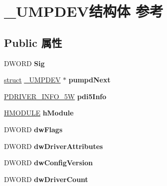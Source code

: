 \hypertarget{struct___u_m_p_d_e_v}{}\section{\+\_\+\+U\+M\+P\+D\+E\+V结构体 参考}
\label{struct___u_m_p_d_e_v}
\subsection*{Public 属性}
\begin{DoxyCompactItemize}
\item 
\mbox{\label{struct___u_m_p_d_e_v_af10f14fe142af9a3df4993b24d7759a9}} 
D\+W\+O\+RD {\bfseries Sig}
\item 
\mbox{\label{struct___u_m_p_d_e_v_aa696bf947431e40e24f0b5d2e3354632}} 
\hyperlink{interfacestruct}{struct} \hyperlink{struct___u_m_p_d_e_v}{\+\_\+\+U\+M\+P\+D\+EV} $\ast$ {\bfseries pumpd\+Next}
\item 
\mbox{\label{struct___u_m_p_d_e_v_abf9ac23be9ce5d1789b994edbbf67f2d}} 
\hyperlink{struct___d_r_i_v_e_r___i_n_f_o__5_w}{P\+D\+R\+I\+V\+E\+R\+\_\+\+I\+N\+F\+O\+\_\+5W} {\bfseries pdi5\+Info}
\item 
\mbox{\label{struct___u_m_p_d_e_v_ad2b15d04c534f15ec64376a24307349b}} 
\hyperlink{interfacevoid}{H\+M\+O\+D\+U\+LE} {\bfseries h\+Module}
\item 
\mbox{\label{struct___u_m_p_d_e_v_ac6164adaa7d00187807ac393afaf067e}} 
D\+W\+O\+RD {\bfseries dw\+Flags}
\item 
\mbox{\label{struct___u_m_p_d_e_v_a0088a142623885435d48e9e3ee0b51ef}} 
D\+W\+O\+RD {\bfseries dw\+Driver\+Attributes}
\item 
\mbox{\label{struct___u_m_p_d_e_v_a72ecede9b564d28a15c69765b04d3a46}} 
D\+W\+O\+RD {\bfseries dw\+Config\+Version}
\item 
\mbox{\label{struct___u_m_p_d_e_v_a0e637681ec669333522f89bb55b68157}} 
D\+W\+O\+RD {\bfseries dw\+Driver\+Count}
\item 

\end{DoxyCompactItemize}
